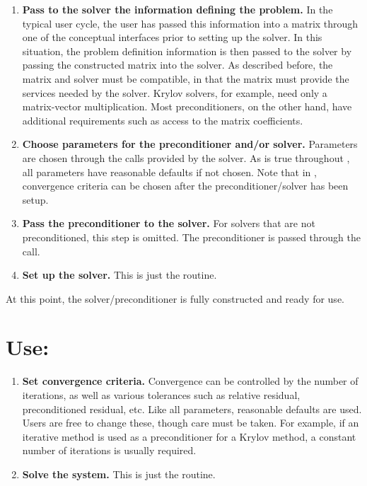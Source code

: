 \begin{enumerate}

\item
{\bf Pass to the solver the information defining the problem.} In the
typical user cycle, the user has passed this information into a matrix
through one of the conceptual interfaces prior to setting up the
solver. In this situation, the problem definition information is then
passed to the solver by passing the constructed matrix into the
solver. As described before, the matrix and solver must be compatible,
in that the matrix must provide the services needed by the
solver. Krylov solvers, for example, need only a matrix-vector
multiplication.  Most preconditioners, on the other hand, have
additional requirements such as access to the matrix coefficients.

\item
{\bf Choose parameters for the preconditioner and/or solver.}
Parameters are chosen through the  calls provided by the
solver.  As is true throughout \hypre{}, all parameters have
reasonable defaults if not chosen.  Note that in \hypre{}, convergence
criteria can be chosen after the preconditioner/solver has been setup.

\item
{\bf Pass the preconditioner to the solver.} For solvers that are not
preconditioned, this step is omitted.  The preconditioner is passed
through the  call.

\item
{\bf Set up the solver.} This is just the  routine.

\end{enumerate}

At this point, the solver/preconditioner is fully constructed and
ready for use.


\section*{Use:}

\begin{enumerate}

\item
{\bf Set convergence criteria.}  Convergence can be controlled by the
number of iterations, as well as various tolerances such as relative
residual, preconditioned residual, etc.  Like all parameters,
reasonable defaults are used.  Users are free to change these, though
care must be taken.  For example, if an iterative method is used as a
preconditioner for a Krylov method, a constant number of iterations is
usually required.

\item
{\bf Solve the system.}  This is just the  routine.

\end{enumerate}

